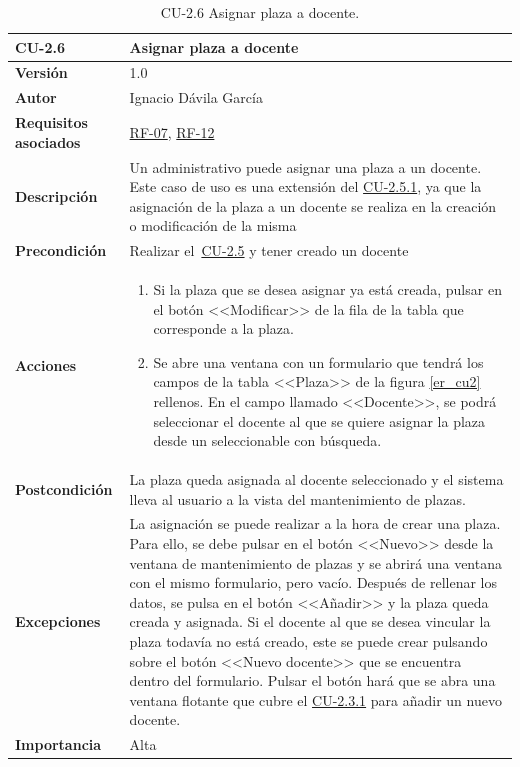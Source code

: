 \begin{table}[p]
\label{table:CU-2.6}
	\centering
	\begin{tabularx}{\linewidth}{ p{} p{} }
		\toprule
		\textbf{CU-2.6}    & \textbf{Asignar plaza a docente}\\
		\toprule
		\textbf{Versión}              & 1.0    \\
		\textbf{Autor}                & Ignacio Dávila García \\
		\textbf{Requisitos asociados} & \hyperref[itm:RF7]{RF-07}, \hyperref[itm:RF12]{RF-12} \\
		\textbf{Descripción}          & Un administrativo puede asignar una plaza a un docente. Este caso de uso es una extensión del \hyperref[table:CU-2.5.1]{CU-2.5.1}, ya que la asignación de la plaza a un docente se realiza en la creación o modificación de la misma \\
		\textbf{Precondición}         & Realizar el~\hyperref[table:CU-2.5]{CU-2.5} y tener creado un docente \\
		\textbf{Acciones}             &
		\begin{enumerate}
			\def\labelenumi{\arabic{enumi}.}
			\tightlist
			\item Si la plaza que se desea asignar ya está creada, pulsar en el botón <<Modificar>> de la fila de la tabla que corresponde a la plaza.
			\item Se abre una ventana con un formulario que tendrá los campos de la tabla <<Plaza>> de la figura \ref{er_cu2} rellenos. En el campo llamado <<Docente>>, se podrá seleccionar el docente al que se quiere asignar la plaza desde un seleccionable con búsqueda.
		\end{enumerate}\\
		\textbf{Postcondición}        & La plaza queda asignada al docente seleccionado y el sistema lleva al usuario a la vista del mantenimiento de plazas. \\
		\textbf{Excepciones}          & La asignación se puede realizar a la hora de crear una plaza. Para ello, se debe pulsar en el botón <<Nuevo>> desde la ventana de mantenimiento de plazas y se abrirá una ventana con el mismo formulario, pero vacío. Después de rellenar los datos, se pulsa en el botón <<Añadir>> y la plaza queda creada y asignada.
		Si el docente al que se desea vincular la plaza todavía no está creado, este se puede crear pulsando sobre el botón <<Nuevo docente>> que se encuentra dentro del formulario. Pulsar el botón hará que se abra una ventana flotante que cubre el \hyperref[table:CU-2.3.1]{CU-2.3.1} para añadir un nuevo docente.\\
		\textbf{Importancia}          & Alta \\
		\bottomrule
	\end{tabularx}
	\caption{CU-2.6 Asignar plaza a docente.}
\end{table}
\FloatBarrier

